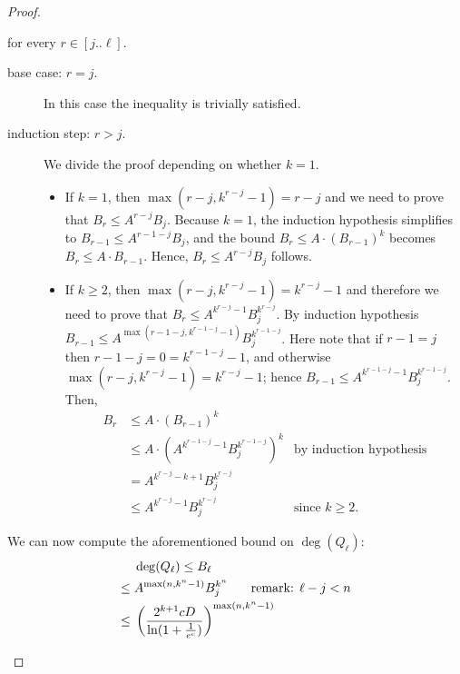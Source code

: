 \begin{proof}
\begin{claimproof}
          for every $r \in [j..\ell]$.
          \begin{description}
            \item[base case: $r = j$.] In this case the inequality is trivially satisfied.
            \item[induction step: $r > j$.] We divide the proof depending on whether $k = 1$.
            \begin{itemize}
            \item If $k = 1$, then $\max(r-j,k^{r-j}-1) = r-j$ and we need to prove that $B_r \leq A^{r-j}B_j$. 
            Because $k = 1$, the induction hypothesis simplifies to $B_{r-1} \leq A^{r-1-j}B_j$, and the bound $B_r \leq A \cdot (B_{r-1})^k$ becomes $B_r \leq A \cdot B_{r-1}$. Hence, $B_r \leq A^{r-j}B_j$  follows.
  
            \item If $k \geq 2$, then $\max(r-j,k^{r-j}-1) = k^{r-j}-1$ and therefore we need to prove that $B_r \leq A^{k^{r-j}-1}B_j^{k^{r-j}}$.
            By induction hypothesis $B_{r-1} \leq A^{\max(r-1-j,k^{r-1-j}-1)}B_j^{k^{r-1-j}}$. Here note that if $r-1=j$ then $r-1-j = 0 = k^{r-1-j}-1$, and otherwise $\max(r-j,k^{r-j}-1) = k^{r-j}-1$; 
            hence $B_{r-1} \leq A^{k^{r-1-j}-1}B_j^{k^{r-1-j}}$.
            Then, 
            \begin{align*}
              B_r &\leq A \cdot (B_{r-1})^k\\
              & \leq A \cdot (A^{k^{r-1-j}-1}B_j^{k^{r-1-j}})^k
              &\text{by induction hypothesis}\\
              & = A^{k^{r-j}-k+1}B_j^{k^{r-j}}\\
              & \leq A^{k^{r-j}-1}B_j^{k^{r-j}}
              &\text{since $k \geq 2$}.
            \end{align*} 
            \end{itemize}
          \end{description}
          We can now compute the aforementioned bound on $\deg(Q_\ell)$:
          \begin{align*}
              & \deg(Q_\ell) \leq B_\ell\\
              \leq{}& A^{\max(n,k^{n}-1)}B_j^{k^{n}}
              & \hspace{-1cm}\text{remark: $\ell - j < n$}
              \\
              \leq{}& 
                \left(\frac{2^{k+1}cD}{\ln(1 + \frac{1}{e^c})}\right)^{\max(n,k^{n}-1)}
              \\

\end{align*}
\end{claimproof}
\end{proof}
